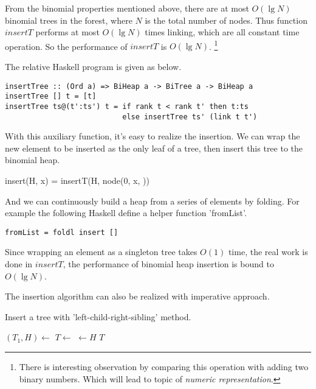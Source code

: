\documentclass{article}
\begin{document}
From the binomial properties mentioned above, there are at most
$O(\lg N)$ binomial trees in the forest, where $N$ is the total
number of nodes. Thus function $insertT$ performs at most $O(\lg N)$
times linking, which are all constant time operation. So the
performance of $insertT$ is $O(\lg N)$. 
\footnote{There is interesting observation by comparing this 
operation with adding two binary numbers. Which will lead to
topic of {\em numeric representation}\cite{okasaki-book}.}

The relative Haskell program is given as below.

\lstset{language=Haskell}
\begin{lstlisting}
insertTree :: (Ord a) => BiHeap a -> BiTree a -> BiHeap a
insertTree [] t = [t]
insertTree ts@(t':ts') t = if rank t < rank t' then t:ts
                           else insertTree ts' (link t t')
\end{lstlisting}

With this auxiliary function, it's easy to realize the insertion.
We can wrap the new element to be inserted as the only leaf of a tree,
then insert this tree to the binomial heap.

\be
insert(H, x) = insertT(H, node(0, x, \phi))
\ee

And we can continuously build a heap from a series of elements by folding.
For example the following Haskell define a helper function 'fromList'.

\begin{lstlisting}
fromList = foldl insert []
\end{lstlisting}

Since wrapping an element as a singleton tree takes $O(1)$ time, 
the real work is done in $insertT$, the performance of binomial
heap insertion is bound to $O(\lg N)$.

The insertion algorithm can also be realized with imperative approach.

\begin{algorithm}
\caption{Insert a tree with 'left-child-right-sibling' method.}
\label{alg:insert-tree}
\begin{algorithmic}[1]
    \State $(T_1, H) \gets$ 
    \State $T \gets $ 
  \EndWhile
  \State {} $\gets H$
  \State \Return $T$
\EndFunction
\end{algorithmic}
\end{algorithm}
\end{document}
